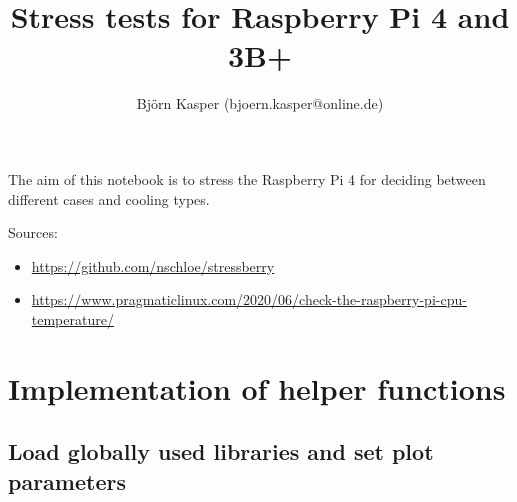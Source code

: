 \documentclass [oneside,10pt,a4paper,ngerman,BCOR10mm,headsepline,parindent,final]{scrartcl}
\title{Stress tests for Raspberry Pi 4 and 3B+}
\author{Björn Kasper (bjoern.kasper@online.de)}
\providecommand{\tightlist}{%
      \setlength{\itemsep}{0pt}\setlength{\parskip}{0pt}}
\begin{document}
    
    \maketitle
    \tableofcontents
    
    

    
    The aim of this notebook is to stress the Raspberry Pi 4 for deciding
between different cases and cooling types.

Sources:

\begin{itemize}
\tightlist
\item
  \url{https://github.com/nschloe/stressberry}
\item
  \url{https://www.pragmaticlinux.com/2020/06/check-the-raspberry-pi-cpu-temperature/}
\end{itemize}

    \hypertarget{implementation-of-helper-functions}{%
\section{Implementation of helper
functions}\label{implementation-of-helper-functions}}

\hypertarget{load-globally-used-libraries-and-set-plot-parameters}{%
\subsection{Load globally used libraries and set plot
parameters}\label{load-globally-used-libraries-and-set-plot-parameters}}
\end{document}
